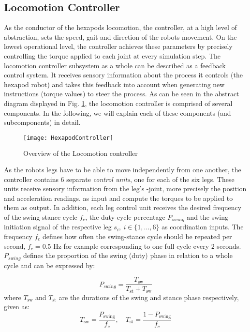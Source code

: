 \subsection{Locomotion Controller} \label{subsec: Locomotion controller}
As the conductor of the hexapods locomotion, the controller, at a high level of abstraction, sets the speed, gait and direction of the robots movement.
On the lowest operational level, the controller achieves these parameters by precisely controlling the torque applied to each joint at every simulation step.
The locomotion controller subsystem as a whole can be described as a feedback control system.
It receives sensory information about the process it controls (the hexapod robot) and takes this feedback into account when generating new instructions (torque values) to steer the process.
As can be seen in the abstract diagram displayed in Fig. \ref{figure: Controller Overview}, the locomotion controller is comprised of several components. 
In the following, we will explain each of these components (and subcomponents) in detail.

\begin{figure}[h]
	\centerline{\texttt{[image: HexapodController]}}
	\caption[Controller Overview]{Overview of the Locomotion controller}
	\label{figure: Controller Overview}
\end{figure}

As the robots legs have to be able to move independently from one another, the controller contains 6 separate \textit{control units}, one for each of the six legs.
These units receive sensory information from the leg's \textalpha-joint, more precisely the position and acceleration readings, as input and compute the torques to be applied to them as output.
In addition, each leg control unit receives the desired frequency of the swing-stance cycle $f_{c}$, the duty-cycle percentage $P_{swing}$ and the swing-initiation signal of the respective leg $s_i,\ i \in \{1,...,6\}$ as coordination inputs.
The frequency $f_{c}$ defines how often the swing-stance cycle should be repeated per second, $f_{c} = 0.5 \text{ Hz}$ for example corresponding to one full cycle every 2 seconds.
$P_{swing}$ defines the proportion of the swing (duty) phase in relation to a whole cycle \parencite{qiu2023adaptive} and can be expressed by: 

\begin{equation}
P_{swing} = \frac{T_\text{sw}} {T_\text{st} + T_\text{sw}}
\end{equation}
where $T_\text{sw}$ and $T_\text{st}$ are the durations of the swing and stance phase respectively, given as:
\begin{equation}
T_\text{sw} = \frac{P_\text{swing}}{f_c}, \quad T_\text{st} = \frac{1-P_\text{swing}}{f_c}
\end{equation}

